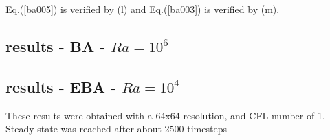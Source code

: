 Eq.(\ref{ba005}) is verified by (l) and Eq.(\ref{ba003}) is verified by (m).




\newpage
\subsection*{results - BA - $Ra=10^6$}






\newpage
\subsection*{results - EBA - $Ra=10^4$}

These results were obtained with a 64x64 resolution, and CFL number of 1. Steady state was reached 
after about 2500 timesteps 

